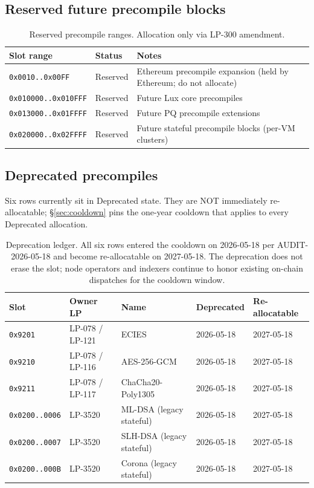 \subsection{Reserved future precompile blocks}

\begin{table}[h]
\centering
\small
\begin{tabular}{@{}lll@{}}
\toprule
\textbf{Slot range} & \textbf{Status} & \textbf{Notes} \\
\midrule
\texttt{0x0010..0x00FF} & Reserved & Ethereum precompile expansion (held by Ethereum; do not allocate) \\
\texttt{0x010000..0x010FFF} & Reserved & Future Lux core precompiles \\
\texttt{0x013000..0x01FFFF} & Reserved & Future PQ precompile extensions \\
\texttt{0x020000..0x02FFFF} & Reserved & Future stateful precompile blocks (per-VM clusters) \\
\bottomrule
\end{tabular}
\caption{Reserved precompile ranges. Allocation only via LP-300
amendment.}
\label{tab:precomp-reserved}
\end{table}

\subsection{Deprecated precompiles}
\label{sec:precomp-deprecated}

Six rows currently sit in Deprecated state. They are NOT immediately
re-allocatable; \S\ref{sec:cooldown} pins the one-year cooldown that
applies to every Deprecated allocation.

\begin{table}[h]
\centering
\small
\begin{tabular}{@{}p{2.6cm}p{2.4cm}p{3.6cm}p{2.0cm}p{2.4cm}@{}}
\toprule
\textbf{Slot} & \textbf{Owner LP} & \textbf{Name} & \textbf{Deprecated} & \textbf{Re-allocatable} \\
\midrule
\texttt{0x9201} & LP-078 / LP-121 & ECIES & 2026-05-18 & 2027-05-18 \\
\texttt{0x9210} & LP-078 / LP-116 & AES-256-GCM & 2026-05-18 & 2027-05-18 \\
\texttt{0x9211} & LP-078 / LP-117 & ChaCha20-Poly1305 & 2026-05-18 & 2027-05-18 \\
\texttt{0x0200..0006} & LP-3520 & ML-DSA (legacy stateful) & 2026-05-18 & 2027-05-18 \\
\texttt{0x0200..0007} & LP-3520 & SLH-DSA (legacy stateful) & 2026-05-18 & 2027-05-18 \\
\texttt{0x0200..000B} & LP-3520 & Corona (legacy stateful) & 2026-05-18 & 2027-05-18 \\
\bottomrule
\end{tabular}
\caption{Deprecation ledger. All six rows entered the cooldown on
2026-05-18 per AUDIT-2026-05-18 and become re-allocatable on
2027-05-18. The deprecation does not erase the slot; node operators
and indexers continue to honor existing on-chain dispatches for the
cooldown window.}
\label{tab:precomp-deprecated}
\end{table}
